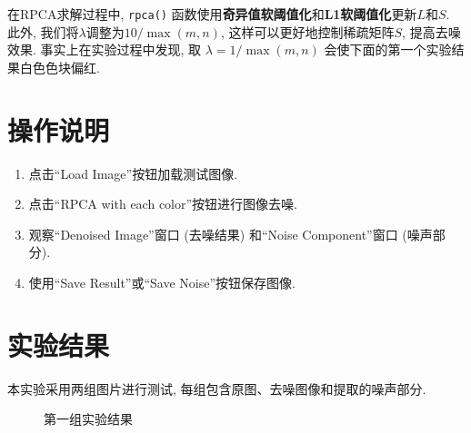 \documentclass[10pt]{article}
\begin{document}
		在RPCA求解过程中, \texttt{rpca()} 函数使用\textbf{奇异值软阈值化}和\textbf{L1软阈值化}更新$L$和$S$. 此外, 我们将$\lambda$调整为$10/\max\left(m, n\right)$, 这样可以更好地控制稀疏矩阵$S$, 提高去噪效果. 事实上在实验过程中发现, 取 $\lambda = 1 / \max\left(m, n\right)$ 会使下面的第一个实验结果白色色块偏红.

	\section{操作说明}
		\begin{enumerate}
			\item 点击``Load Image''按钮加载测试图像.
			\item 点击``RPCA with each color''按钮进行图像去噪.
			\item 观察``Denoised Image''窗口 (去噪结果) 和``Noise Component''窗口 (噪声部分).
			\item 使用``Save Result''或``Save Noise''按钮保存图像.
		\end{enumerate}

	\section{实验结果}
		本实验采用两组图片进行测试, 每组包含原图、去噪图像和提取的噪声部分.

		\begin{figure}[htbp]
			\centering
			\caption{第一组实验结果}
		\end{figure}
\end{document}
